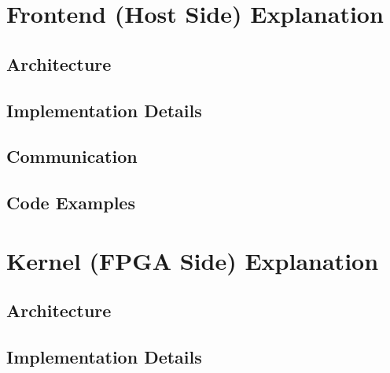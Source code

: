 \documentclass[12pt,oneside,a4paper]{article}
\begin{document}

\section{Frontend (Host Side) Explanation} 

\subsection{Architecture}

\subsection{Implementation Details}

\subsection{Communication}

\subsection{Code Examples}





\section{Kernel (FPGA Side) Explanation} 

\subsection{Architecture}

\subsection{Implementation Details}
\end{document}
